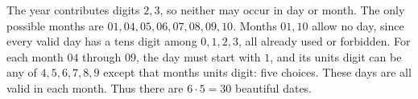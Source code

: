 The year contributes digits $2,3$, so neither may occur in day or month. The only possible months are $01,04,05,06,07,08,09,10$. Months $01,10$ allow no day, since every valid day has a tens digit among $0,1,2,3$, all already used or forbidden. For each month $04$ through $09$, the day must start with $1$, and its units digit can be any of $4,5,6,7,8,9$ except that month\textquotesingle s units digit: five choices. These days are all valid in each month. Thus there are $6\cdot5=\boxed{30}$ beautiful dates.
